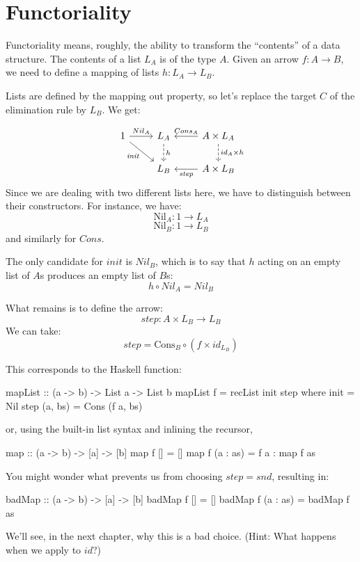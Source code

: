 \documentclass[DaoFP]{subfiles}
\begin{document}
\section{Functoriality}

Functoriality means, roughly, the ability to transform the ``contents'' of a data structure. The contents of a list $L_A$ is of the type $A$. Given an arrow $f \colon A \to B$, we need to define a mapping of lists $h \colon L_A \to L_B$.

Lists are defined by the mapping out property, so let's replace the target $C$ of the elimination rule by $L_B$. We get:

\[
 \begin{tikzcd}
 1
 \arrow[r, "Nil_A"]
 \arrow[rd, "\mathit{init}"']
 &L_A
\arrow[d, dashed, "h"]
&A \times L_A
  \arrow[l, "Cons_A"']
\arrow[d, dashed, "id_A \times h"]
\\
& L_B
& A \times L_B
\arrow[l, "\mathit{step}"]
  \end{tikzcd}
\]
Since we are dealing with two different lists here, we have to distinguish between their constructors. For instance, we have: 
\[\text{Nil}_A \colon 1 \to L_A \]
\[\text{Nil}_B \colon 1 \to L_B \]
and similarly for $Cons$.

The only candidate for $\mathit{init}$ is $Nil_B$, which is to say that $h$ acting on an empty list of $A$s produces an empty list of $B$s:
\[ h \circ Nil_A = Nil_B \]

What remains is to define the arrow:
\[\mathit{step} \colon A \times L_B \to L_B\]
We can take:
\[ \mathit{step} = \text{Cons}_B \circ (f \times id_{L_B}) \]

This corresponds to the Haskell function:

\begin{haskell}
mapList :: (a -> b) -> List a -> List b
mapList f = recList init step
  where
    init = Nil
    step (a, bs) = Cons (f a, bs)
\end{haskell}
or, using the built-in list syntax and inlining the recursor,
\begin{haskell}
map :: (a -> b) -> [a] -> [b]
map f [] = []
map f (a : as) = f a : map f as
\end{haskell}

You might wonder what prevents us from choosing $\mathit{step} = \mathit{snd}$, resulting in:
\begin{haskell}
badMap :: (a -> b) -> [a] -> [b]
badMap f [] = []
badMap f (a : as) = badMap f as
\end{haskell}
We'll see, in the next chapter, why this is a bad choice. (Hint: What happens when we apply  to $id$?)
\end{document}
